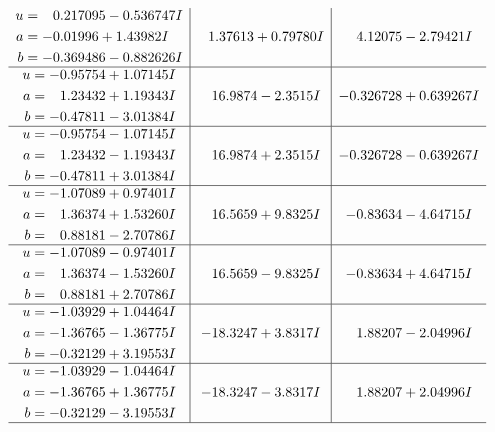 \documentclass[1p]{elsarticle_modified}
\theoremstyle{definition}
\begin{document}
$$\begin{array}{c|c|c}
\begin{aligned}
u &= \phantom{-}0.217095 - 0.536747 I \\
a &= -0.01996 + 1.43982 I \\
b &= -0.369486 - 0.882626 I\end{aligned}
 & \phantom{-}1.37613 + 0.79780 I & \phantom{-}4.12075 - 2.79421 I \\ \hline\begin{aligned}
u &= -0.95754 + 1.07145 I \\
a &= \phantom{-}1.23432 + 1.19343 I \\
b &= -0.47811 - 3.01384 I\end{aligned}
 & \phantom{-}16.9874 - 2.3515 I & -0.326728 + 0.639267 I \\ \hline\begin{aligned}
u &= -0.95754 - 1.07145 I \\
a &= \phantom{-}1.23432 - 1.19343 I \\
b &= -0.47811 + 3.01384 I\end{aligned}
 & \phantom{-}16.9874 + 2.3515 I & -0.326728 - 0.639267 I \\ \hline\begin{aligned}
u &= -1.07089 + 0.97401 I \\
a &= \phantom{-}1.36374 + 1.53260 I \\
b &= \phantom{-}0.88181 - 2.70786 I\end{aligned}
 & \phantom{-}16.5659 + 9.8325 I & -0.83634 - 4.64715 I \\ \hline\begin{aligned}
u &= -1.07089 - 0.97401 I \\
a &= \phantom{-}1.36374 - 1.53260 I \\
b &= \phantom{-}0.88181 + 2.70786 I\end{aligned}
 & \phantom{-}16.5659 - 9.8325 I & -0.83634 + 4.64715 I \\ \hline\begin{aligned}
u &= -1.03929 + 1.04464 I \\
a &= -1.36765 - 1.36775 I \\
b &= -0.32129 + 3.19553 I\end{aligned}
 & -18.3247 + 3.8317 I & \phantom{-}1.88207 - 2.04996 I \\ \hline\begin{aligned}
u &= -1.03929 - 1.04464 I \\
a &= -1.36765 + 1.36775 I \\
b &= -0.32129 - 3.19553 I\end{aligned}
 & -18.3247 - 3.8317 I & \phantom{-}1.88207 + 2.04996 I\\
 \hline 
 \end{array}$$\newpage\newpage\renewcommand{\arraystretch}{1}
\end{document}
